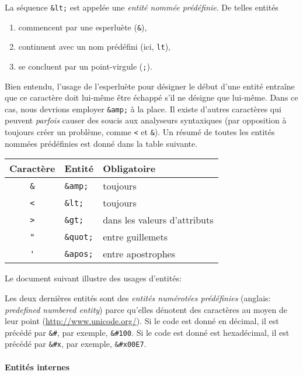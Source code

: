 La séquence \verb|&lt;| est appelée une \emph{entité nommée
  prédéfinie}. De telles entités
\begin{enumerate}

  \item commencent par une esperluète (\verb|&|),

  \item continuent avec un nom prédéfini (ici, \texttt{lt}),

  \item se concluent par un point-virgule (\texttt{;}).

\end{enumerate}
Bien entendu, l'usage de l'esperluète pour désigner le début d'une
entité entraîne que ce caractère doit lui-même être échappé s'il ne
désigne que lui-même. Dans ce cas, nous devrions employer \verb|&amp;|
à la place. Il existe d'autres caractères qui peuvent \emph{parfois}
causer des soucis aux analyseurs syntaxiques \XML (par opposition à
toujours créer un problème, comme \verb|<| et \verb|&|). Un résumé de
toutes les entités nommées prédéfinies est donné dans la table
suivante.
\begin{center}
\begin{tabular}{cll}
\toprule
\textsf{Caractère} & \textsf{Entité} & \textsf{Obligatoire}\\
\midrule
\verb|&| & \verb|&amp;|  & toujours\\
\verb|<| & \verb|&lt;|   & toujours\\
\verb|>| & \verb|&gt;|   & dans les valeurs d'attributs\\
\verb|"| & \verb|&quot;| & entre guillemets\\
\verb|'| & \verb|&apos;| & entre apostrophes\\
\bottomrule
\end{tabular}
\end{center}

\noindent Le document suivant illustre des usages d'entités:

\noindent Les deux dernières entités sont des \emph{entités numérotées
  prédéfinies} (anglais: \emph{predefined numbered entity}) parce
qu'elles dénotent des caractères au moyen de leur point \Unicode
(\url{http://www.unicode.org/}). Si le code est donné en décimal, il
est précédé par \verb|&#|, par exemple, \verb|&#100|.  Si le code est
donné est hexadécimal, il est précédé par \verb|&#x|, par exemple,
\verb|&#x00E7|.

\paragraph{Entités internes}


